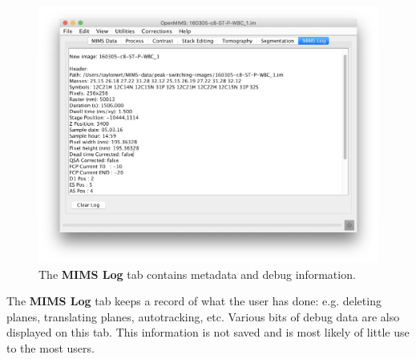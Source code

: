 \documentclass{article}
\begin{document}
	\begin{figure}[htp]
	\centering
	\includegraphics[scale=0.65]{snapshotMIMSlog.png}
	\caption{The \textbf{MIMS Log} tab contains metadata and debug information.}
	\end{figure}	
	

	
	The \textbf{MIMS Log} tab keeps a record of what the user has done: 
	e.g. deleting planes, translating planes, autotracking, etc. Various bits
	of debug data are also displayed on this tab.
	This information is not saved and is most likely of little use to the most users.


	
   

\newpage
\end{document}
